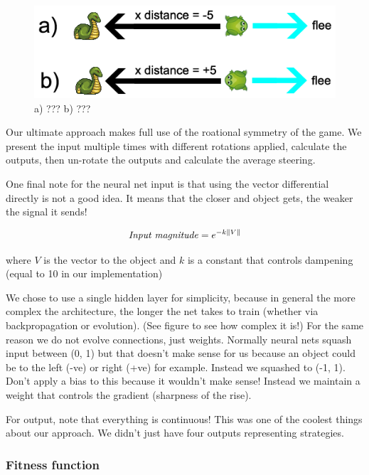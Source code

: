 \begin{figure}[!htbp]
    \centering
    \includegraphics[scale=0.6]{Figs/NormalisationProblem.png}
    \caption{a) ??? b) ???}
    \label{fig:NormalisationProblem}
\end{figure}

Our ultimate approach makes full use of the roational symmetry of the game. We present the input multiple times with different rotations applied, calculate the outputs, then un-rotate the outputs and calculate the average steering.

One final note for the neural net input is that using the vector differential directly is not a good idea. It means that the closer and object gets, the weaker the signal it sends!

\begin{align}
\text{\textit{Input magnitude}} = e^{-k\|V\|}
\end{align}

where $V$ is the vector to the object and $k$ is a constant that controls dampening (equal to 10 in our implementation)

We chose to use a single hidden layer for simplicity, because in general the more complex the architecture, the longer the net takes to train (whether via backpropagation or evolution). (See figure to see how complex it is!) For the same reason we do not evolve connections, just weights. Normally neural nets squash input between (0, 1) but that doesn't make sense for us because an object could be to the left (-ve) or right (+ve) for example. Instead we squashed to (-1, 1). Don't apply a bias to this because it wouldn't make sense! Instead we maintain a weight that controls the gradient (sharpness of the rise).

For output, note that everything is continuous! This was one of the coolest things about our approach. We didn't just have four outputs representing strategies.

\subsubsection{Fitness function}

